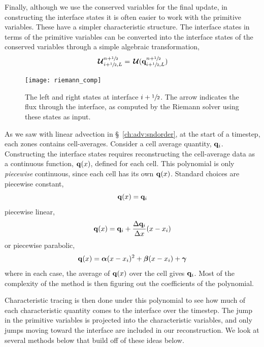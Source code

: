 Finally, although we use the conserved variables for the final update,
in constructing the interface states it is often easier to work with
the primitive variables.  These have a simpler characteristic
structure.  The interface states in terms of the primitive variables
can be converted into the interface states of the conserved variables
through a simple algebraic transformation,
\begin{equation}
{\,\boldsymbol{\mathcal{U}}}_{i+{\sfrac{1}{2}},L}^{n+{\sfrac{1}{2}}} = {\,\boldsymbol{\mathcal{U}}}({\bf q}_{i+{\sfrac{1}{2}},L}^{n+{\sfrac{1}{2}}})
\end{equation}

\begin{figure}[t]
\centering
\texttt{[image: riemann\_comp]}
\caption[The left and right states for the Riemann
  problem]{\label{fig:riemann} The left and right states at interface
  $i+{\sfrac{1}{2}}$.  The arrow indicates the flux through the interface, as
  computed by the Riemann solver using these states as input.}
\end{figure}

As we saw with linear advection in \S~\ref{ch:adv:sndorder},
at the start of a timestep, each zones contains cell-averages.
Consider a cell average quantity, ${\bf q}_i$.
Constructing the interface states requires reconstructing the
cell-average data as a continuous function, ${\bf q}(x)$, defined for
each cell.  This polynomial is only {\em piecewise} continuous, since
each cell has its own ${\bf q}(x)$.  Standard choices are piecewise constant,
\begin{equation}
{\bf q}(x) = {\bf q}_i
\end{equation}
piecewise linear,
\begin{equation}
{\bf q}(x) = {\bf q}_i + \frac{\Delta {\bf q}_i}{\Delta x}(x - x_i)
\end{equation}
or piecewise parabolic,
\begin{equation}
{\bf q}(x) = \boldsymbol{\alpha} (x - x_i)^2 + \boldsymbol{\beta} (x - x_i) + \boldsymbol{\gamma}
\end{equation}
where in each case, the average of ${\bf q}(x)$ over the cell gives ${\bf q}_i$.
Most of the complexity of the method is then figuring out the coefficients
of the polynomial.

Characteristic tracing is then done under this polynomial to see how
much of each characteristic quantity comes to the interface over the
timestep.  The jump in the primitive variables is projected into the
characteristic variables, and only jumps moving toward the interface
are included in our reconstruction.  We look at several methods below
that build off of these ideas below.

